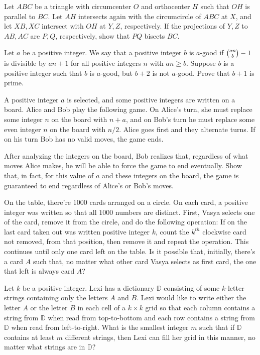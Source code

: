 \documentclass[11pt]{scrartcl}
\begin{document}
\begin{problem}[1427062131747349943]
Let $ABC$ be a triangle with circumcenter $O$ and orthocenter $H$ such that $OH$ is parallel to $BC$. Let $AH$ intersects again with the circumcircle of $ABC$ at $X$, and let $XB, XC$ intersect with $OH$ at $Y, Z$, respectively. If the projections of $Y,Z$ to $AB,AC$ are $P,Q$, respectively, show that $PQ$ bisects $BC$.
\end{problem}
\begin{problem}[1440964279096111130]
	Let $a$ be a positive integer. We say that a positive integer $b$ is $a$-good if $\tbinom{an}{b}-1$ is divisible by $an+1$ for all positive integers $n$ with $an \geq b$. Suppose $b$ is a positive integer such that $b$ is $a$-good, but $b+2$ is not $a$-good. Prove that $b+1$ is prime.
\end{problem}
\begin{problem}[1473691226426629581]
A positive integer $a$ is selected, and some positive integers are written on a board. Alice and Bob play the following game. On Alice's turn, she must replace some integer $n$ on the board with $n+a$, and on Bob's turn he must replace some even integer $n$ on the board with $n/2$. Alice goes first and they alternate turns. If on his turn Bob has no valid moves, the game ends.

After analyzing the integers on the board, Bob realizes that, regardless of what moves Alice makes, he will be able to force the game to end eventually. Show that, in fact, for this value of $a$ and these integers on the board, the game is guaranteed to end regardless of Alice's or Bob's moves.
\end{problem}
\begin{problem}[1527496195334546428]
On the table, there're $1000$ cards arranged on a circle. On each card, a positive integer was written so that all $1000$ numbers are distinct. First, Vasya selects one of the card, remove it from the circle, and do the following operation: If on the last card taken out was written positive integer $k$, count the $k^{th}$ clockwise card not removed, from that position, then remove it and repeat the operation. This continues until only one card left on the table. Is it possible that, initially, there's a card $A$ such that, no matter what other card Vasya selects as first card, the one that left is always card $A$?
\end{problem}
\begin{problem}[1547794310266184263]
Let $k$ be a positive integer. Lexi has a dictionary $\mathbb{D}$ consisting of some $k$-letter strings containing only the letters $A$ and $B$. Lexi would like to write either the letter $A$ or the letter $B$ in each cell of a $k \times k$ grid so that each column contains a string from $\mathbb{D}$ when read from top-to-bottom and each row contains a string from $\mathbb{D}$ when read from left-to-right.
What is the smallest integer $m$ such that if $\mathbb{D}$ contains at least $m$ different strings, then Lexi can fill her grid in this manner, no matter what strings are in $\mathbb{D}$?
\end{problem}
\end{document}

